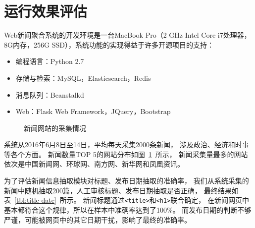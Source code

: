 \section{运行效果评估}
\label{sec:system:runtime}

Web新闻聚合系统的开发环境是一台MacBook Pro（2 GHz Intel Core i7处理器，
8G内存，256G SSD），系统功能的实现得益于许多开源项目的支持：
\begin{itemize}
\item 编程语言：Python 2.7
\item 存储与检索：MySQL，Elasticsearch，Redis
\item 消息队列：Beanstalkd
\item Web：Flask Web Framework，JQuery，Bootstrap
\end{itemize}

\newcommand{\slice}[4]{
  \pgfmathparse{0.5*#1+0.5*#2}
  \let\midangle\pgfmathresult

  \draw[thick,fill=black!10] (0,0) -- (#1:1) arc (#1:#2:1) -- cycle;

  \node[label=\midangle:#4] at (\midangle:1) {};

  \pgfmathparse{min((#2-#1-10)/110*(-0.3),0)}
  \let\temp\pgfmathresult
  \pgfmathparse{max(\temp,-0.5) + 0.8}
  \let\innerpos\pgfmathresult
  \node at (\midangle:\innerpos) {#3};
}

\begin{figure}[htbp]
\centering
{}
\caption{新闻网站的采集情况}
\label{fig:news-breakdown}
\end{figure}

系统从2016年6月8日至14日，平均每天采集2000条新闻，
涉及政治、经济和时事等各个方面。
新闻数量TOP 5的网站分布如图~\ref{fig:news-breakdown}~所示，
新闻采集量最多的网站依次是中国新闻网、环球网、南方网、新华网和凤凰资讯。

为了评估新闻信息抽取模块对标题、发布日期抽取的准确率，
我们从系统采集的新闻中随机抽取200篇，人工审核标题、发布日期抽取是否正确，
最终结果如表~\ref{tbl:title-date}~所示。
新闻标题通过\texttt{<title>}和\texttt{<h1>}联合确定，
在新闻网页中基本都符合这个规律，所以在样本中准确率达到了100\%。
而发布日期的判断不够严谨，可能被网页中的其它日期干扰，影响了最终的准确率。

